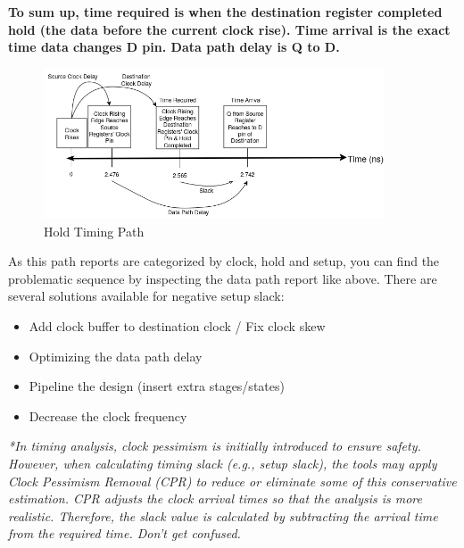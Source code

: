 \documentclass{report}
\begin{document}
\textbf{To sum up, time required is when the destination register completed hold (the data before the current clock rise). Time arrival is the exact time data changes D pin. Data path delay is Q to D.}

\begin{figure}[h!]
    \centering
    \includegraphics[width=0.9\textwidth]{images/hold_analys.png}
    \caption{Hold Timing Path}
    \label{fig:hold_timing_path}
\end{figure}


As this path reports are categorized by clock, hold and setup, you can find the problematic sequence by inspecting the data path report like above. 
There are several solutions available for negative setup slack:
\begin{itemize}
    \item Add clock buffer to destination clock / Fix clock skew
    \item Optimizing the data path delay
    \item Pipeline the design (insert extra stages/states)
    \item Decrease the clock frequency
\end{itemize}

\textit{*In timing analysis, clock pessimism is initially introduced to ensure safety. However, when calculating timing slack (e.g., setup slack), the tools may apply Clock Pessimism Removal (CPR) to reduce or eliminate some of this conservative estimation. CPR adjusts the clock arrival times so that the analysis is more realistic. Therefore, the slack value is calculated by subtracting the arrival time from the required time. Don't get confused.}
\end{document}
